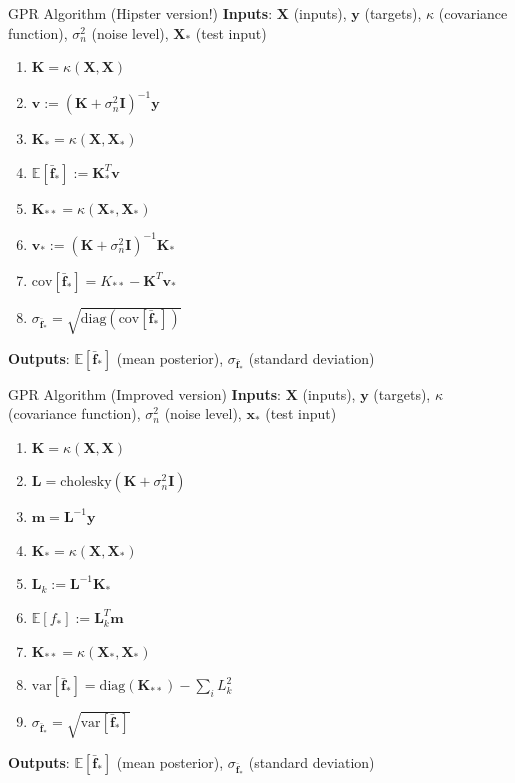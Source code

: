 \documentclass[10pt]{beamer}
\begin{document}
\begin{frame}[fragile]{GPR Algorithm (Hipster version!)}  %
	\textbf{Inputs}: $\mathbf{X}$ (inputs), $\mathbf{y}$ (targets), $\kappa$ (covariance function), $\sigma_n^2$ (noise level), $\mathbf{X}_*$ (test input)
	\begin{enumerate}
		\item $\mathbf{K} = \kappa (\mathbf{X}, \mathbf{X})$
		\item  $\mathbf{v} := (\mathbf{K} + \sigma^2_n \mathbf{I})^{-1} \mathbf{y}$
		\item $\mathbf{K}_* =  \kappa (\mathbf{X}, \mathbf{X}_*)$
		\item  $\mathbb{E} [\bar{\mathbf{f}}_*] := \mathbf{K}_*^T \mathbf{v} $
		\item $\mathbf{K}_{**} =  \kappa (\mathbf{X}_*, \mathbf{X}_*)$
		\item  $\mathbf{v}_* := (\mathbf{K} + \sigma^2_n \mathbf{I})^{-1} \mathbf{K}_*$
		\item  $\text{cov}[\bar{\mathbf{f}}_*] = K_{**} - \mathbf{K}^T \mathbf{v}_*$
		\item $\sigma_{\bar{\mathbf{f}}_*} = \sqrt{\text{diag} \left(\text{cov}[\bar{\mathbf{f}}_*]\right)}$
	\end{enumerate} 	
	\textbf{Outputs}: $\mathbb{E} [\bar{\mathbf{f}}_*]$ (mean posterior), $\sigma_{\bar{\mathbf{f}}_*}$ (standard deviation)
\end{frame}

\begin{frame}[fragile]{GPR Algorithm (Improved version)}  %
	\textbf{Inputs}: $\mathbf{X}$ (inputs), $\mathbf{y}$ (targets), $\kappa$ (covariance function), $\sigma_n^2$ (noise level), $\mathbf{x}_*$ (test input)
	\begin{enumerate}
		\item $\mathbf{K} = \kappa (\mathbf{X}, \mathbf{X})$
		\item $\mathbf{L} = \text{cholesky}(\mathbf{K} + \sigma^2_n \mathbf{I})$ 
		\item $\mathbf{m} = \mathbf{L}^{-1} \mathbf{y}$ 
		\item $\mathbf{K}_* =  \kappa (\mathbf{X}, \mathbf{X}_*)$
		\item  $\mathbf{L}_k := \mathbf{L}^{-1} \mathbf{K}_*$
		\item  $\mathbb{E} [f_*] := \mathbf{L}_k^T \mathbf{m} $
		\item $\mathbf{K}_{**} =  \kappa (\mathbf{X}_*, \mathbf{X}_*)$
		\item  $\text{var}[\bar{\mathbf{f}}_*] = \text{diag} \left(\mathbf{K}_{**}\right) - \sum_i L_k^2$
		\item $\sigma_{\bar{\mathbf{f}}_*} = \sqrt{\text{var}[\bar{\mathbf{f}}_*]}$
	\end{enumerate} 	
	\textbf{Outputs}: $\mathbb{E} [\bar{\mathbf{f}}_*]$ (mean posterior), $\sigma_{\bar{\mathbf{f}}_*}$ (standard deviation)
\end{frame}
\end{document}
